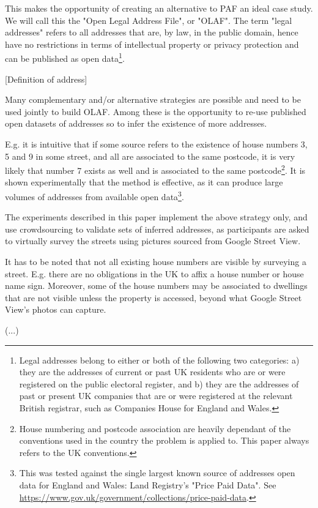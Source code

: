     This makes the opportunity of creating an alternative to PAF an ideal case study. We will call this the "Open Legal Address File", or "OLAF". The term "legal addresses" refers to all addresses that are, by law, in the public domain, hence have no restrictions in terms of intellectual property or privacy protection and can be published as open data\footnote{Legal addresses belong to either or both of the following two categories: a) they are the addresses of current or past UK residents who are or were registered on the public electoral register, and b) they are the addresses of past or present UK companies that are or were registered at the relevant British registrar, such as Companies House for England and Wales.}.

    {[}Definition of address{]}
    
    Many complementary and/or alternative strategies are possible and need to be used jointly to build OLAF. Among these is the opportunity to re-use published open datasets of addresses so to infer the existence of more addresses. 
    
    E.g. it is intuitive that if some source refers to the existence of house numbers 3, 5 and 9 in some street, and all are associated to the same postcode, it is very likely that number 7 exists as well and is associated to the same postcode\footnote{House numbering and postcode association are heavily dependant of the conventions used in the country the problem is applied to. This paper always refers to the UK conventions.}. It is shown experimentally that the method is effective, as it can produce large volumes of addresses from available open data\footnote{This was tested against the single largest known source of addresses open data for England and Wales: Land Registry's "Price Paid Data". See \url{https://www.gov.uk/government/collections/price-paid-data}.}.
    
    The experiments described in this paper implement the above strategy only, and  use crowdsourcing to validate sets of inferred addresses, as participants are asked to virtually survey the streets using pictures sourced from Google Street View.
    
    It has to be noted that not all existing house numbers are visible by surveying a street. E.g. there are no obligations in the UK to affix a house number or house name sign. Moreover, some of the house numbers may be associated to dwellings that are not visible unless the property is accessed, beyond what Google Street View's photos can capture.
    
    {(}...{)}